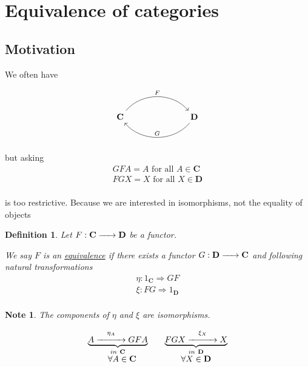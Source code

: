 \documentclass{article}
\newtheorem{definition}{Definition}[section]
\newtheorem{note}{Note}[section]
\renewcommand{\to}{\xrightarrow{\hspace{0.5cm}}}  %
\begin{document}
    \section{Equivalence of categories}

    \subsection{Motivation}

    We often have

    \[
        \begin{tikzcd}[column sep=7em, row sep=4em]
            \mathbf{C} \arrow[r, bend left=50, "F"{name=F, above}]
            & \mathbf{D} \arrow[l, bend left=50, "G"{name=G, above}]
        \end{tikzcd}
    \]

    but asking
    \begin{gather*}
        GFA = A \text{ for all } A \in \mathbf{C}\\
        FGX = X \text{ for all } X \in \mathbf{D}\\
    \end{gather*}

    is too restrictive. Because we are interested in isomorphisms, not the equality of objects


    \begin{definition}
        Let \(F: \mathbf{C} \to \mathbf{D}\) be a functor.

        We say \(F\) is an \underline{equivalence} if there exists a functor \(G: \mathbf{D} \to \mathbf{C}\) and
        following natural transformations
        \begin{gather*}
            \eta: 1_{\mathbf{C}} \Rightarrow GF\\
            \xi: FG \Rightarrow 1_{\mathbf{D}}\\
        \end{gather*}

    \end{definition}

    \begin{note}
        The components of \(\eta\) and \(\xi\) are isomorphisms.

        \[
            \begin{array}{c c} %
                \underbrace{A \stackrel{\eta_A}{\xrightarrow{\hspace{1cm}}} GFA}_{in \ \mathbf{C}} \quad
                &
                \underbrace{FGX \stackrel{\xi_X}{\xrightarrow{\hspace{1cm}}} X}_{in \ \mathbf{D}} \\

                \forall A \in \mathbf{C} & \forall X \in \mathbf{D} \\
            \end{array}
        \]
    \end{note}
\end{document}
